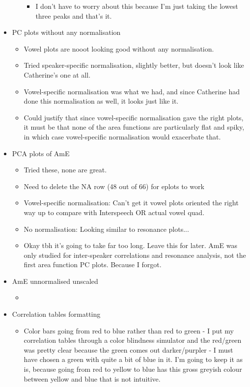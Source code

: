 \documentclass{article}
\begin{document}
\begin{itemize}
\begin{itemize}
\begin{itemize}
            \item I don't have to worry about this because I'm just taking the lowest three peaks and that's it.
        \end{itemize}
    \end{itemize}
    \item PC plots without any normalisation
    \begin{itemize}
        \item Vowel plots are nooot looking good without any normalisation.
        \item Tried speaker-specific normalisation, slightly better, but doesn't look like Catherine's one at all.
        \item Vowel-specific normalisation was what we had, and since Catherine had done this normalisation as well, it looks just like it.
        \item Could justify that since vowel-specific normalisation gave the right plots, it must be that none of the area functions are particularly flat and spiky, in which case vowel-specific normalisation would exacerbate that. 
    \end{itemize}
    \item PCA plots of AmE
    \begin{itemize}
        \item Tried these, none are great.
        \item Need to delete the NA row (48 out of 66) for eplots to work
        \item Vowel-specific normalisation: Can't get it vowel plots oriented the right way up to compare with Interspeech OR actual vowel quad.
        \item No normalisation: Looking similar to resonance plots...
        \item Okay tbh it's going to take far too long. Leave this for later. AmE was only studied for inter-speaker correlations and resonance analysis, not the first area function PC plots. Because I forgot.
    \end{itemize}
    \item AmE unnormalised unscaled
    \begin{itemize}
        \item 
    \end{itemize}
    \item Correlation tables formatting
    \begin{itemize}
        \item Color bars going from red to blue rather than red to green - I put my correlation tables through a color blindness simulator and the red/green was pretty clear because the green comes out darker/purpler - I must have chosen a green with quite a bit of blue in it. I'm going to keep it as is, because going from red to yellow to blue has this gross greyish colour between yellow and blue that is not intuitive.

\end{itemize}
\end{itemize}
\end{document}
